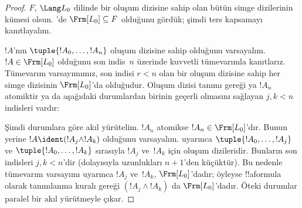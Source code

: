 \documentclass[../../../include/open-logic-section]{subfiles}
\begin{document}
\begin{proof}
$F$, $\Lang L_0$ dilinde bir oluşum dizisine sahip olan bütün simge
dizilerinin kümesi olsun. 'de
$\Frm[L_0] \subseteq F$ olduğunu gördük; şimdi ters kapsamayı kanıtlayalım.

$!A$'nın $\tuple{!A_0,\dotsc,!A_n}$ oluşum dizisine sahip olduğunu
varsayalım. $!A \in \Frm[L_0]$ olduğunu son indis~$n$ üzerinde kuvvetli
tümevarımla kanıtlarız. Tümevarım varsayımımız, son indisi $r<n$ olan bir
oluşum dizisine sahip her simge dizisinin $\Frm[L_0]$'da olduğudur. Oluşum
dizisi tanımı gereği ya $!A_n$ atomiktir ya da aşağıdaki durumlardan birinin
geçerli olmasını sağlayan $j,k < n$ indisleri vardır:
\begin{enumerate}
\end{enumerate}
Şimdi durumlara göre akıl yürütelim. $!A_n$ atomikse
$!A_n \in \Frm[L_0]$'dır. Bunun yerine $!A \ident
(!A_j \land !A_k)$ olduğunu varsayalım.
 uyarınca
$\tuple{!A_0,\dotsc,!A_j}$ ve $\tuple{!A_0,\dotsc,!A_k}$ sırasıyla $!A_j$
ve~$!A_k$ için oluşum dizileridir. Bunların son indisleri $j,k<n$'dir
(dolayısıyla uzunlukları $n+1$'den küçüktür). Bu nedenle tümevarım varsayımı
uyarınca $!A_j$ ve~$!A_k$, $\Frm[L_0]$'dadır; öyleyse !!a{formula} olarak tanımlanma kuralı
gereği $(!A_j \land !A_k)$ da $\Frm[L_0]$'dadır. Öteki durumlar paralel bir
akıl yürütmeyle çıkar.
\end{proof}
\end{document}

